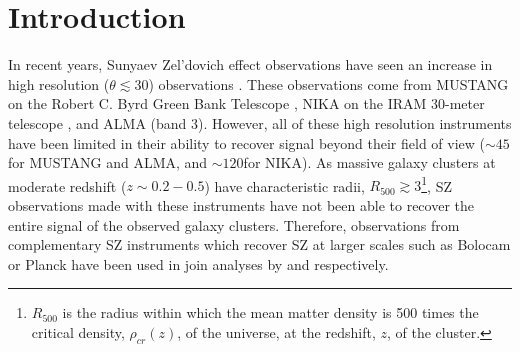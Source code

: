 \documentclass[twocolumn,traditabstract]{aa}
\begin{document}
\maketitle

\section{Introduction}
\label{sec:intro}



In recent years, Sunyaev Zel'dovich \citep[SZ,][]{sunyaev1970,sunyaev1972}
effect observations have seen an increase in high resolution ($\theta \lesssim 30$\asecs)
observations \citep[e.g.][]{mason2010,adam2014,kitayama2016}. These observations come from MUSTANG on the
Robert C. Byrd Green Bank Telescope \citep[GBT][]{dicker2008}, NIKA on the IRAM 30-meter telescope \citep{monfardini2010},
and ALMA (band 3). However, all of these high resolution instruments have been limited in their ability to
recover signal beyond their field of view ($\sim 45$\asecs for MUSTANG and ALMA, and $\sim 120$\asecs for NIKA). As massive
galaxy clusters at moderate redshift ($z \sim 0.2-0.5$) have characteristic radii,
$R_{500} \gtrsim 3$\amin\footnote{$R_{500}$ is the radius within which the mean matter density is 500 times the
  critical density, $\rho_{cr}(z)$, of the universe, at the redshift, $z$, of the cluster.},
SZ observations made with these instruments have not been able to recover the
entire signal of the observed galaxy clusters. Therefore, observations from complementary SZ instruments which recover SZ at larger scales
such as Bolocam \citet{czakon2015} or Planck \citep{planck2013a} have been used in join analyses by
\citet{romero2015a} and \citet{adam2015,adam2016a} respectively.
\end{document}
